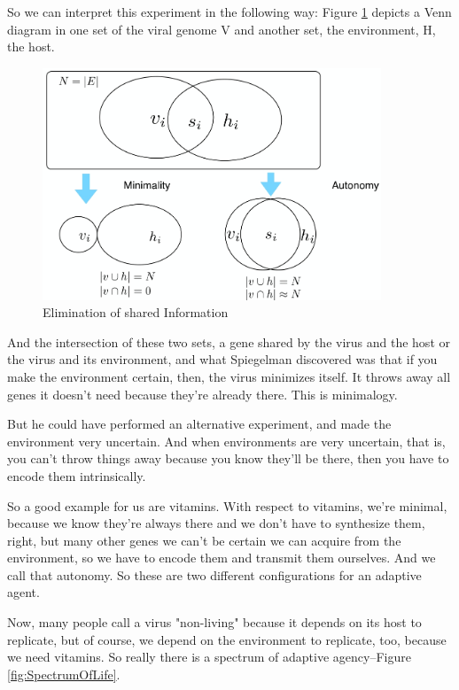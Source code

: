 \documentclass[]{article}
\begin{document}
So we can interpret this experiment
in the following way:
Figure \ref{fig:SpiegelmanMonsterVenn} depicts a Venn diagram
in one set of the viral genome V
and another set, the environment, H,
the host.

\begin{figure}[H]
	\caption{Elimination of shared Information}\label{fig:SpiegelmanMonsterVenn}
	\includegraphics[width=0.9\textwidth]{SpiegelmanMonsterVenn}
\end{figure}
And the intersection of these
two sets, a gene shared
by the virus and the host
or the virus and its environment,
and what Spiegelman discovered
was that if you make the environment
certain, then, the virus minimizes itself.
It throws away all genes it doesn't need
because they're already there.
This is minimalogy.

But he could have performed
an alternative experiment, and made
the environment very uncertain.
And when environments are very uncertain,
that is, you can't throw things away
because you know they'll be there,
then you have to encode them
intrinsically.

So a good example for us are vitamins.
With respect to vitamins, we're minimal,
because we know they're always there
and we don't have to synthesize them,
right, but many other genes we can't
be certain we can acquire
from the environment, so we
have to encode them and transmit
them ourselves. And we call that autonomy.
So these are two different configurations
for an adaptive agent.

Now, many people call a virus "non-living"
because it depends on its host
to replicate, but of course,
we depend on the environment to replicate,
too, because we need vitamins.
So really there is a spectrum of
adaptive agency--Figure \ref{fig:SpectrumOfLife}.
\end{document}
